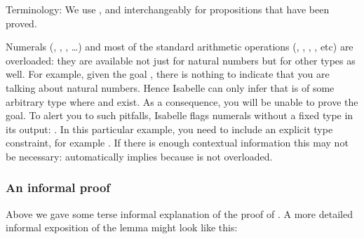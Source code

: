 \begin{isabellebody}
\begin{isamarkuptxt}
\begin{warn}
Terminology: We use ,  and 
interchangeably for propositions that have been proved.
\end{warn}
\begin{warn}
  Numerals (, , , \dots) and most of the standard
  arithmetic operations (, , , ,
   etc) are overloaded: they are available
  not just for natural numbers but for other types as well.
  For example, given the goal , there is nothing to indicate
  that you are talking about natural numbers. Hence Isabelle can only infer
  that  is of some arbitrary type where  and 
  exist. As a consequence, you will be unable to prove the
  goal. To alert you to such pitfalls, Isabelle flags numerals without a
  fixed type in its output: .  In this particular example,
  you need to include
  an explicit type constraint, for example . If there
  is enough contextual information this may not be necessary:  automatically implies  because  is not
  overloaded.
\end{warn}

\subsubsection{An informal proof}

Above we gave some terse informal explanation of the proof of
. A more detailed informal exposition of the lemma
might look like this:
\bigskip


\end{isamarkuptxt}
\end{isabellebody}
